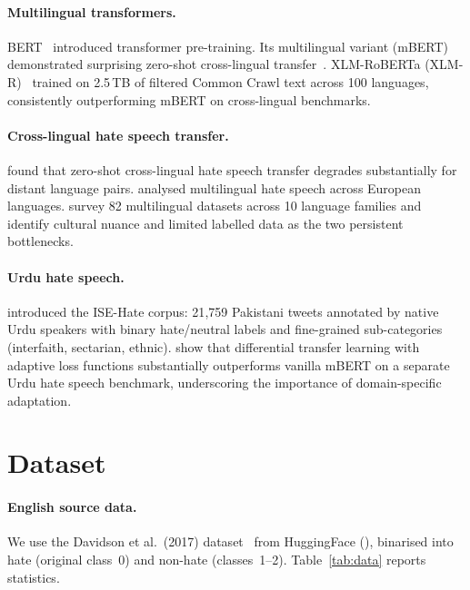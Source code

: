 \documentclass{article}
\begin{document}
\paragraph{Multilingual transformers.}
BERT~\citep{devlin2019bert} introduced transformer pre-training.
Its multilingual variant (mBERT) demonstrated surprising zero-shot
cross-lingual transfer~\citep{pires2019multilingual}.
XLM-RoBERTa (XLM-R)~\citep{conneau2020unsupervised} trained on 2.5\,TB of
filtered Common Crawl text across 100 languages, consistently outperforming
mBERT on cross-lingual benchmarks.

\paragraph{Cross-lingual hate speech transfer.}
\citet{nozza2021exposing} found that zero-shot cross-lingual hate speech
transfer degrades substantially for distant language pairs.
\citet{ousidhoum2019multilingual} analysed multilingual hate speech across
European languages.
\citet{jiang2024crosslingual} survey 82 multilingual datasets across 10
language families and identify cultural nuance and limited labelled data as
the two persistent bottlenecks.

\paragraph{Urdu hate speech.}
\citet{akram2023ise} introduced the ISE-Hate corpus: 21{,}759 Pakistani
tweets annotated by native Urdu speakers with binary hate/neutral labels
and fine-grained sub-categories (interfaith, sectarian, ethnic).
\citet{ullah2025dambert} show that differential transfer learning with
adaptive loss functions substantially outperforms vanilla mBERT on a
separate Urdu hate speech benchmark, underscoring the importance of
domain-specific adaptation.

\section{Dataset}
\label{sec:data}

\paragraph{English source data.}
We use the Davidson et al.\ (2017) dataset~\citep{davidson2017automated}
from HuggingFace (), binarised into
hate (original class~0) and non-hate (classes~1--2).
Table~\ref{tab:data} reports statistics.
\end{document}
